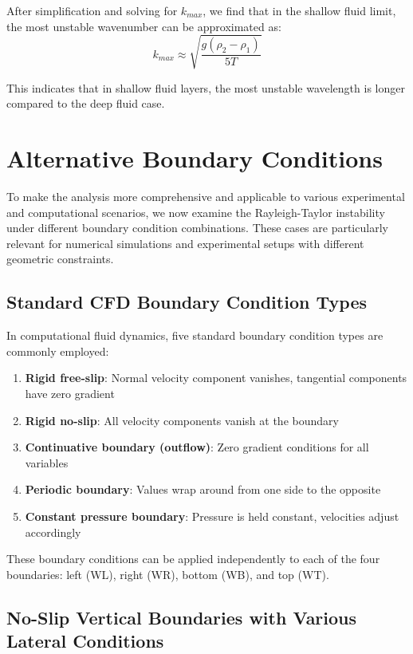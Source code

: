 \documentclass[12pt,a4paper]{article}
\begin{document}
After simplification and solving for $k_{max}$, we find that in the shallow fluid limit, the most unstable wavenumber can be approximated as:
\begin{equation}
k_{max} \approx \sqrt{\frac{g(\rho_2 - \rho_1)}{5T}}
\end{equation}

This indicates that in shallow fluid layers, the most unstable wavelength is longer compared to the deep fluid case.

\section{Alternative Boundary Conditions}

To make the analysis more comprehensive and applicable to various experimental and computational scenarios, we now examine the Rayleigh-Taylor instability under different boundary condition combinations. These cases are particularly relevant for numerical simulations and experimental setups with different geometric constraints.

\subsection{Standard CFD Boundary Condition Types}

In computational fluid dynamics, five standard boundary condition types are commonly employed:
\begin{enumerate}
    \item \textbf{Rigid free-slip}: Normal velocity component vanishes, tangential components have zero gradient
    \item \textbf{Rigid no-slip}: All velocity components vanish at the boundary
    \item \textbf{Continuative boundary (outflow)}: Zero gradient conditions for all variables
    \item \textbf{Periodic boundary}: Values wrap around from one side to the opposite
    \item \textbf{Constant pressure boundary}: Pressure is held constant, velocities adjust accordingly
\end{enumerate}

These boundary conditions can be applied independently to each of the four boundaries: left (WL), right (WR), bottom (WB), and top (WT).

\subsection{No-Slip Vertical Boundaries with Various Lateral Conditions}
\end{document}
